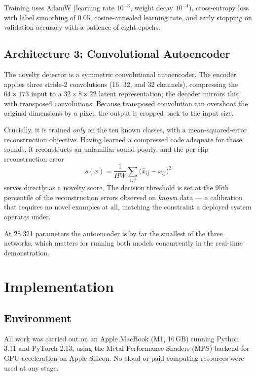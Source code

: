 \documentclass[11pt, a4paper]{article}
\newcommand{\aeParams}{28{,}321}
\begin{document}
Training uses AdamW (learning rate $10^{-3}$, weight decay $10^{-4}$), cross-entropy loss with label smoothing of 0.05, cosine-annealed learning rate, and early stopping on validation accuracy with a patience of eight epochs.

\subsection{Architecture 3: Convolutional Autoencoder}

The novelty detector is a symmetric convolutional autoencoder. The encoder applies three stride-2 convolutions (16, 32, and 32 channels), compressing the $64 \times 173$ input to a $32 \times 8 \times 22$ latent representation; the decoder mirrors this with transposed convolutions. Because transposed convolution can overshoot the original dimensions by a pixel, the output is cropped back to the input size.

Crucially, it is trained \emph{only} on the ten known classes, with a mean-squared-error reconstruction objective. Having learned a compressed code adequate for those sounds, it reconstructs an unfamiliar sound poorly, and the per-clip reconstruction error
\[
s(x) = \frac{1}{HW}\sum_{i,j}\bigl(\hat{x}_{ij} - x_{ij}\bigr)^2
\]
serves directly as a novelty score. The decision threshold is set at the 95th percentile of the reconstruction errors observed on \emph{known} data --- a calibration that requires no novel examples at all, matching the constraint a deployed system operates under.

At \aeParams{} parameters the autoencoder is by far the smallest of the three networks, which matters for running both models concurrently in the real-time demonstration.

\section{Implementation}
\label{sec:impl}

\subsection{Environment}

All work was carried out on an Apple MacBook (M1, 16\,GB) running Python 3.11 and PyTorch 2.13, using the Metal Performance Shaders (MPS) backend for GPU acceleration on Apple Silicon. No cloud or paid computing resources were used at any stage.
\end{document}
